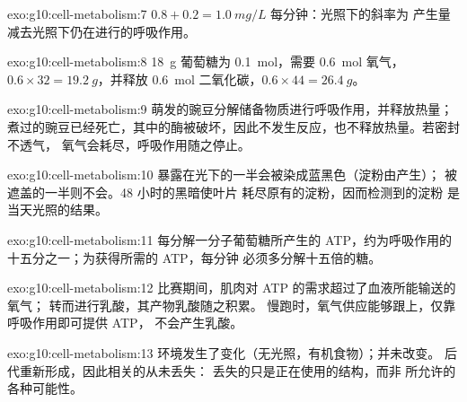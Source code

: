 \begin{solution}{exo:g10:cell-metabolism:7}
$0.8 + 0.2 = \qty{1.0}{mg/L}$ 每分钟：光照下的斜率为
产生量减去光照下仍在进行的呼吸作用。
\end{solution}

\begin{solution}{exo:g10:cell-metabolism:8}
\qty{18}{g} 葡萄糖为 \qty{0.1}{mol}，需要 \qty{0.6}{mol}
氧气，$0.6 \times 32 = \qty{19.2}{g}$，并释放 \qty{0.6}{mol}
二氧化碳，$0.6 \times 44 = \qty{26.4}{g}$。
\end{solution}

\begin{solution}{exo:g10:cell-metabolism:9}
萌发的豌豆分解储备物质进行呼吸作用，并释放热量；
煮过的豌豆已经死亡，其中的酶被破坏，因此不发生反应，也不释放热量。若密封不透气，
氧气会耗尽，呼吸作用随之停止。
\end{solution}

\begin{solution}{exo:g10:cell-metabolism:10}
暴露在光下的一半会被染成蓝黑色（淀粉由产生）；
被遮盖的一半则不会。48 小时的黑暗使叶片
耗尽原有的淀粉，因而检测到的淀粉
是当天光照的结果。
\end{solution}

\begin{solution}{exo:g10:cell-metabolism:11}
每分解一分子葡萄糖所产生的 ATP，约为呼吸作用的
十五分之一；为获得所需的 ATP，每分钟
必须多分解十五倍的糖。
\end{solution}

\begin{solution}{exo:g10:cell-metabolism:12}
比赛期间，肌肉对 ATP 的需求超过了血液所能输送的氧气；
转而进行乳酸，其产物乳酸随之积累。
慢跑时，氧气供应能够跟上，仅靠呼吸作用即可提供 ATP，
不会产生乳酸。
\end{solution}

\begin{solution}{exo:g10:cell-metabolism:13}
环境发生了变化（无光照，有机食物）；并未改变。
后代重新形成，因此相关的从未丢失：
丢失的只是正在使用的结构，而非
所允许的各种可能性。
\end{solution}

